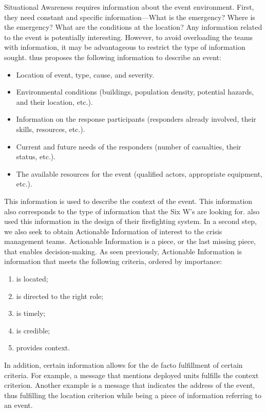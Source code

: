 Situational Awareness requires information about the event environment.
First, they need constant and specific information—What is the emergency? Where is the emergency? What are the conditions at the location?
Any information related to the event is potentially interesting.
However, to avoid overloading the teams with information, it may be advantageous to restrict the type of information sought.
\textcite{jacksonInformationSharingEmergency2006} thus proposes the following information to describe an event:

\begin{itemize}
    \item Location of event, type, cause, and severity.
    \item Environmental conditions (buildings, population density, potential hazards, and their location, etc.).
    \item Information on the response participants (responders already involved, their skills, resources, etc.).
    \item Current and future needs of the responders (number of casualties, their status, etc.).
    \item The available resources for the event (qualified actors, appropriate equipment, etc.).
\end{itemize}

This information is used to describe the context of the event.
This information also corresponds to the type of information that the Six W's are looking for.
\textcite{yangDesignPrinciplesIntegrated2012} also used this information in the design of their firefighting system.
In a second step, we also seek to obtain Actionable Information of interest to the crisis management teams.
Actionable Information is a piece, or the last missing piece, that enables decision-making.
As seen previously, Actionable Information is information that meets the following criteria, ordered by importance:

\begin{enumerate}
    \item is located;
    \item is directed to the right role;
    \item is timely;
    \item is credible;
    \item provides context.
\end{enumerate}

In addition, certain information allows for the de facto fulfillment of certain criteria.
For example, a message that mentions deployed units fulfills the context criterion.
Another example is a message that indicates the address of the event, thus fulfilling the location criterion while being a piece of information referring to an event.

